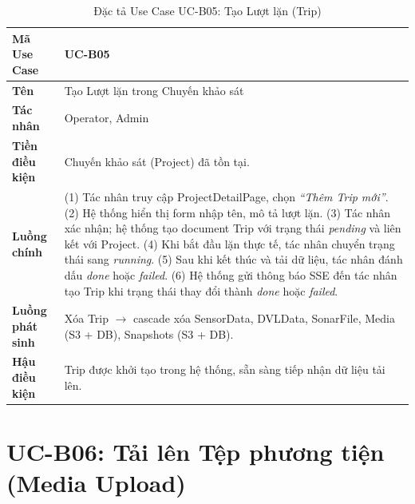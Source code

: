 \documentclass[../DoAn.tex]{subfiles}
\begin{document}
\begin{longtable}{|p{3.5cm}|p{10.0cm}|}
\caption{Đặc tả Use Case UC-B05: Tạo Lượt lặn (Trip)}\label{tab:ucb05}\\
\hline
\textbf{Mã Use Case} & UC-B05 \\
\hline
\textbf{Tên} & Tạo Lượt lặn trong Chuyến khảo sát \\
\hline
\textbf{Tác nhân} & Operator, Admin \\
\hline
\textbf{Tiền điều kiện} & Chuyến khảo sát (Project) đã tồn tại. \\
\hline
\textbf{Luồng chính} &
(1) Tác nhân truy cập ProjectDetailPage, chọn \textit{``Thêm Trip mới''}. \newline
(2) Hệ thống hiển thị form nhập tên, mô tả lượt lặn. \newline
(3) Tác nhân xác nhận; hệ thống tạo document Trip với trạng thái \textit{pending} và liên kết với Project. \newline
(4) Khi bắt đầu lặn thực tế, tác nhân chuyển trạng thái sang \textit{running}. \newline
(5) Sau khi kết thúc và tải dữ liệu, tác nhân đánh dấu \textit{done} hoặc \textit{failed}. \newline
(6) Hệ thống gửi thông báo SSE đến tác nhân tạo Trip khi trạng thái thay đổi thành \textit{done} hoặc \textit{failed}. \\
\hline
\textbf{Luồng phát sinh} & Xóa Trip $\to$ cascade xóa SensorData, DVLData, SonarFile, Media (S3 + DB), Snapshots (S3 + DB). \\
\hline
\textbf{Hậu điều kiện} & Trip được khởi tạo trong hệ thống, sẵn sàng tiếp nhận dữ liệu tải lên. \\
\hline
\end{longtable}

\section{UC-B06: Tải lên Tệp phương tiện (Media Upload)}
\end{document}
